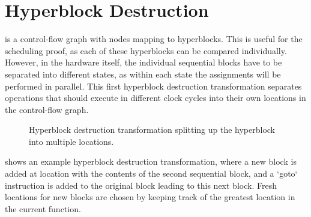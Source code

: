 \section{Hyperblock Destruction}%
\label{sec:hg:hyperblock-destruction}

\rtlpar{} is a control-flow graph with nodes mapping to hyperblocks.  This is
useful for the scheduling proof, as each of these hyperblocks can be compared
individually.  However, in the hardware itself, the individual sequential blocks
have to be separated into different states, as within each state the
assignments will be performed in parallel.  This first hyperblock destruction
transformation separates operations that should execute in different clock
cycles into their own locations in the control-flow graph.

\begin{figure}
  \centering
  \caption{Hyperblock destruction transformation splitting up the hyperblock into
    multiple locations.}%
  \label{fig:hg:hyperblock-destruction}
\end{figure}

 shows an example hyperblock destruction
transformation, where a new block is added at location  with the
contents of the second sequential block, and a \rtlinline`goto` instruction is
added to the original block leading to this next block.  Fresh locations for new
blocks are chosen by keeping track of the greatest location in the current
function.

